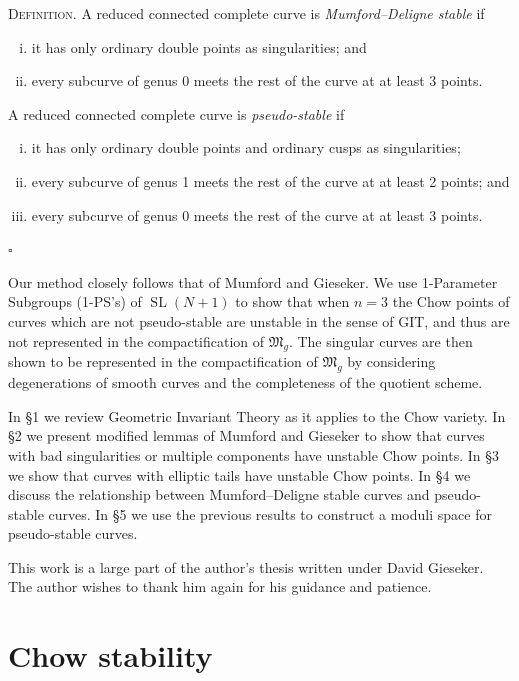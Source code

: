 \documentclass[12pt]{memoir}
\providecommand{\SL}{\operatorname{SL}}
\begin{document}
\medskip

\noindent\textsc{Definition.} A reduced connected complete curve is \emph{Mumford--Deligne stable} if

\begin{enumerate}[(i)]
\item it has only ordinary double points as singularities; and
\item every subcurve of genus 0 meets the rest of the curve at at least 3 points.
\end{enumerate}

\noindent A reduced connected complete curve is \emph{pseudo-stable} if

\begin{enumerate}[(i)]
\item it has only ordinary double points and ordinary cusps as singularities;
\item every subcurve of genus 1 meets the rest of the curve at at least 2 points; and
\item every subcurve of genus 0 meets the rest of the curve at at least 3 points.
\end{enumerate}
\hfill$\square$

\medskip

Our method closely follows that of Mumford and Gieseker. We use 1-Parameter Subgroups (1-PS's) of $\SL(N+1)$ to show that when $n=3$ the Chow points of curves which are not pseudo-stable are unstable in the sense of GIT, and thus are not represented in the compactification of $\mathfrak{M}_g$. The singular curves are then shown to be represented in the compactification of $\mathfrak{M}_g$ by considering degenerations of smooth curves and the completeness of the quotient scheme.


In \S1 we review Geometric Invariant Theory as it applies to the Chow variety. In \S2 we present modified lemmas of Mumford and Gieseker to show that curves with bad singularities or multiple components have unstable Chow points. In \S3 we show that curves with elliptic tails have unstable Chow points. In \S4 we discuss the relationship between Mumford--Deligne stable curves and pseudo-stable curves. In \S5 we use the previous results to construct a moduli space for pseudo-stable curves.

This work is a large part of the author's thesis written under David Gieseker. The author wishes to thank him again for his guidance and patience.

\section{Chow stability}
\end{document}
